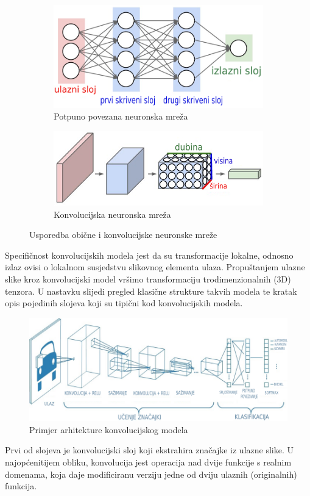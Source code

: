 \documentclass[times, utf8, diplomski]{fer}
\theoremstyle{definition}
\begin{document}
\begin{figure}[h]
\centering
\begin{subfigure}{.5\textwidth}
\centering
\includegraphics[width=\linewidth]{neural_net2.png}
\caption{Potpuno povezana neuronska mreža}
\label{fig:sub1}
\end{subfigure}%
\begin{subfigure}{.5\textwidth}
\centering
\includegraphics[width=\linewidth]{cnn.png}
\caption{Konvolucijska neuronska mreža}
\label{fig:sub2}
\end{subfigure}
\caption{Usporedba obične i konvolucijske neuronske mreže}
\label{fig:test}
\end{figure}

Specifičnost konvolucijskih modela jest da su transformacije lokalne, odnosno izlaz ovisi o lokalnom susjedstvu slikovnog elementa ulaza. Propuštanjem ulazne slike kroz konvolucijski model vršimo transformaciju trodimenzionalnih (3D) tenzora. U nastavku slijedi pregled klasične strukture takvih modela te kratak opis pojedinih slojeva koji su tipični kod konvolucijskih modela.
\begin{figure}
\centering
\includegraphics[scale=0.3]{architecture.png}
\caption{Primjer arhitekture konvolucijskog modela}
\end{figure}
\newpage Prvi od slojeva je konvolucijski sloj koji ekstrahira značajke iz ulazne slike. U najopćenitijem obliku, konvolucija jest operacija nad dvije funkcije s realnim domenama, koja daje modificiranu verziju jedne od dviju ulaznih (originalnih) funkcija.
\end{document}
